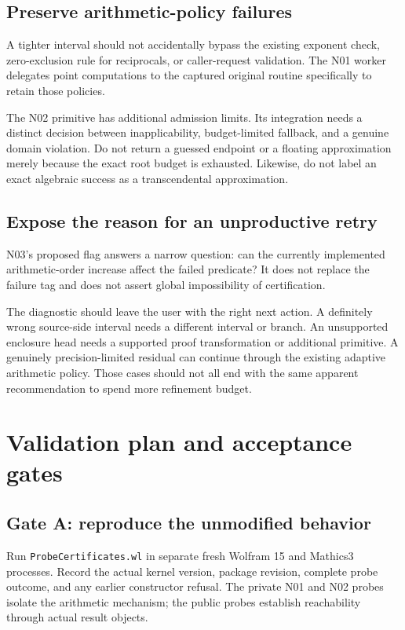 \documentclass[11pt,a4paper]{article}
\newcommand{\code}[1]{\nolinkurl{#1}}
\begin{document}
\subsection{Preserve arithmetic-policy failures}

A tighter interval should not accidentally bypass the existing exponent check, zero-exclusion rule for reciprocals, or caller-request validation. The N01 worker delegates point computations to the captured original routine specifically to retain those policies.

The N02 primitive has additional admission limits. Its integration needs a distinct decision between inapplicability, budget-limited fallback, and a genuine domain violation. Do not return a guessed endpoint or a floating approximation merely because the exact root budget is exhausted. Likewise, do not label an exact algebraic success as a transcendental approximation.

\subsection{Expose the reason for an unproductive retry}

N03's proposed flag answers a narrow question: can the currently implemented arithmetic-order increase affect the failed predicate? It does not replace the failure tag and does not assert global impossibility of certification.

The diagnostic should leave the user with the right next action. A definitely wrong source-side interval needs a different interval or branch. An unsupported enclosure head needs a supported proof transformation or additional primitive. A genuinely precision-limited residual can continue through the existing adaptive arithmetic policy. Those cases should not all end with the same apparent recommendation to spend more refinement budget.

\section{Validation plan and acceptance gates}
\subsection{Gate A: reproduce the unmodified behavior}

Run \code{ProbeCertificates.wl} in separate fresh Wolfram 15 and Mathics3 processes. Record the actual kernel version, package revision, complete probe outcome, and any earlier constructor refusal. The private N01 and N02 probes isolate the arithmetic mechanism; the public probes establish reachability through actual result objects.
\end{document}
